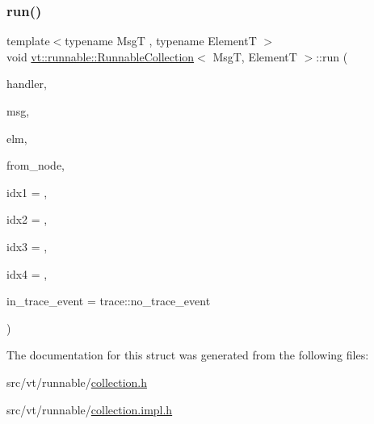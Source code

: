\subsubsection{\texorpdfstring{run()}{run()}}
{\footnotesize\ttfamily template$<$typename MsgT , typename ElementT $>$ \\
void \hyperlink{structvt_1_1runnable_1_1_runnable_collection}{vt\+::runnable\+::\+Runnable\+Collection}$<$ MsgT, ElementT $>$\+::run (\begin{DoxyParamCaption}\item[{\hyperlink{namespacevt_af64846b57dfcaf104da3ef6967917573}{Handler\+Type}}]{handler,  }\item[{MsgT $\ast$}]{msg,  }\item[{ElementT $\ast$}]{elm,  }\item[{\hyperlink{namespacevt_a866da9d0efc19c0a1ce79e9e492f47e2}{Node\+Type}}]{from\+\_\+node,  }\item[{uint64\+\_\+t}]{idx1 = {},  }\item[{uint64\+\_\+t}]{idx2 = {},  }\item[{uint64\+\_\+t}]{idx3 = {},  }\item[{uint64\+\_\+t}]{idx4 = {},  }\item[{\hyperlink{namespacevt_1_1trace_a64a7185f3e102df8d8258f263ccd1582}{trace\+::\+Trace\+Event\+I\+D\+Type}}]{in\+\_\+trace\+\_\+event = {\ttfamily trace\+:\+:no\+\_\+trace\+\_\+event} }\end{DoxyParamCaption})\hspace{0.3cm}{\ttfamily [static]}}



The documentation for this struct was generated from the following files\+:\begin{DoxyCompactItemize}
\item 
src/vt/runnable/\hyperlink{collection_8h}{collection.\+h}\item 
src/vt/runnable/\hyperlink{collection_8impl_8h}{collection.\+impl.\+h}\end{DoxyCompactItemize}
